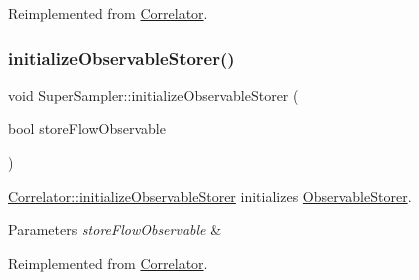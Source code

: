 Reimplemented from \mbox{\hyperlink{class_correlator_a7fb062b098beb078f3e546f4717b4941}{Correlator}}.

\mbox{\label{class_super_sampler_a4429d6ae37247a02259bc0c6d665821c}} 
\subsubsection{\texorpdfstring{initializeObservableStorer()}{initializeObservableStorer()}}
{\footnotesize\ttfamily void Super\+Sampler\+::initialize\+Observable\+Storer (\begin{DoxyParamCaption}\item[{bool}]{store\+Flow\+Observable }\end{DoxyParamCaption})\hspace{0.3cm}{\ttfamily [virtual]}}



\mbox{\hyperlink{class_correlator_ab99886c09dd27dfc8676d0032cecf9bc}{Correlator\+::initialize\+Observable\+Storer}} initializes \mbox{\hyperlink{class_observable_storer}{Observable\+Storer}}. 


\begin{DoxyParams}{Parameters}
{\em store\+Flow\+Observable} & \\
\hline
\end{DoxyParams}


Reimplemented from \mbox{\hyperlink{class_correlator_ab99886c09dd27dfc8676d0032cecf9bc}{Correlator}}.

